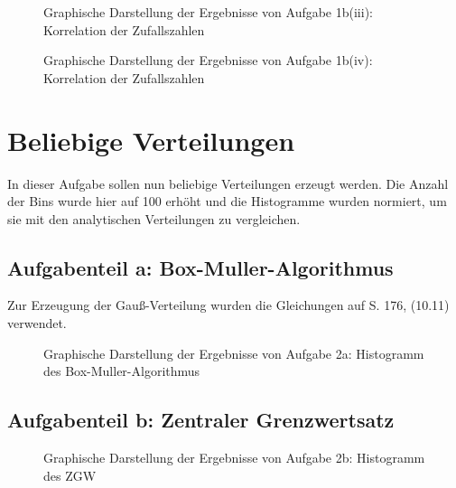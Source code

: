 \begin{landscape}
	\begin{figure}
		\caption{Graphische Darstellung der Ergebnisse von Aufgabe 1b(iii): Korrelation der Zufallszahlen}
		\label{fig:1b3korr}
	\end{figure}
\end{landscape}


\begin{landscape}
	\begin{figure}
		\caption{Graphische Darstellung der Ergebnisse von Aufgabe 1b(iv): Korrelation der Zufallszahlen}
		\label{fig:1b4korr}
	\end{figure}
\end{landscape}

\section*{Beliebige Verteilungen}
In dieser Aufgabe sollen nun beliebige Verteilungen erzeugt werden.
Die Anzahl der Bins wurde hier auf 100 erhöht und die Histogramme wurden normiert, um sie mit den analytischen Verteilungen zu vergleichen.
\subsection*{Aufgabenteil a: Box-Muller-Algorithmus}
Zur Erzeugung der Gauß-Verteilung wurden die Gleichungen auf S. 176, (10.11) verwendet.

\begin{landscape}
	\begin{figure}
		\caption{Graphische Darstellung der Ergebnisse von Aufgabe 2a: Histogramm des Box-Muller-Algorithmus}
		\label{fig:2a}
	\end{figure}
\end{landscape}

\subsection*{Aufgabenteil b: Zentraler Grenzwertsatz}

\begin{landscape}
	\begin{figure}
		\caption{Graphische Darstellung der Ergebnisse von Aufgabe 2b: Histogramm des ZGW}
		\label{fig:2b}
	\end{figure}
\end{landscape}

